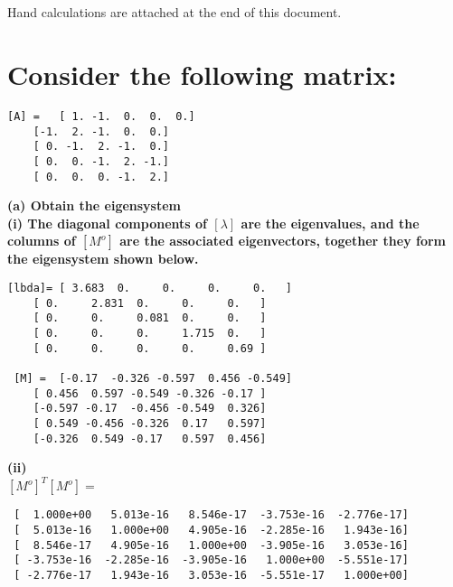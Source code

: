 \documentclass[letterpaper, 10pt, oneside]{article}
\newenvironment{dd}[1]{
	\noindent
	\textbf{\normalsize{#1}}
	\hspace{0.1in}
	\small
	\rmfamily
	}
	{\medskip}
\newcommand{\bdd}{\begin{dd}}
\begin{document}
\section{}
Hand calculations are attached at the end of this document.

\section{Consider the following matrix:}

\begin{lstlisting}
[A] = 	[ 1. -1.  0.  0.  0.]
 	[-1.  2. -1.  0.  0.]
 	[ 0. -1.  2. -1.  0.]
 	[ 0.  0. -1.  2. -1.]
 	[ 0.  0.  0. -1.  2.]
\end{lstlisting}


\bdd{(a) Obtain the eigensystem}\\

\bf{(i)}
The diagonal components of $[\lambda]$ are the eigenvalues, and the columns of $[M^o]$ are the associated eigenvectors, together they form the eigensystem shown below.

 \begin{lstlisting}
[lbda]=	[ 3.683  0.     0.     0.     0.   ]
	[ 0.     2.831  0.     0.     0.   ]
	[ 0.     0.     0.081  0.     0.   ]
	[ 0.     0.     0.     1.715  0.   ]
	[ 0.     0.     0.     0.     0.69 ]

 [M] = 	[-0.17  -0.326 -0.597  0.456 -0.549]
 	[ 0.456  0.597 -0.549 -0.326 -0.17 ]
 	[-0.597 -0.17  -0.456 -0.549  0.326]
 	[ 0.549 -0.456 -0.326  0.17   0.597]
 	[-0.326  0.549 -0.17   0.597  0.456]
 \end{lstlisting}

 \bf{(ii)}\\

 $[M^o]^T[M^o] = $
\begin{lstlisting}
 [  1.000e+00   5.013e-16   8.546e-17  -3.753e-16  -2.776e-17]
 [  5.013e-16   1.000e+00   4.905e-16  -2.285e-16   1.943e-16]
 [  8.546e-17   4.905e-16   1.000e+00  -3.905e-16   3.053e-16]
 [ -3.753e-16  -2.285e-16  -3.905e-16   1.000e+00  -5.551e-17]
 [ -2.776e-17   1.943e-16   3.053e-16  -5.551e-17   1.000e+00]
\end{lstlisting}
\end{document}
